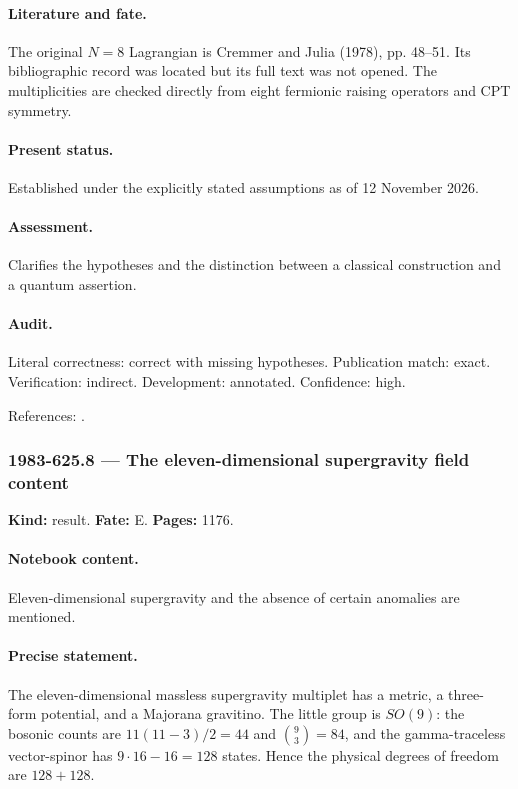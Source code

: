 \paragraph{Literature and fate.} The original \(N=8\) Lagrangian is Cremmer and Julia (1978), pp. 48–51. Its bibliographic record was located but its full text was not opened. The multiplicities are checked directly from eight fermionic raising operators and CPT symmetry.

\paragraph{Present status.} Established under the explicitly stated assumptions as of 12 November 2026.

\paragraph{Assessment.} Clarifies the hypotheses and the distinction between a classical construction and a quantum assertion.

\paragraph{Audit.} Literal correctness: correct with missing hypotheses. Publication match: exact. Verification: indirect. Development: annotated. Confidence: high.

\noindent References: \citep{cremmerjulia1978eight}.\par

\subsubsection{1983-625.8 --- The eleven-dimensional supergravity field content}

\label{item:1983-625.8}

\noindent\textbf{Kind:} result. \textbf{Fate:} E. \textbf{Pages:} 1176.\par

\paragraph{Notebook content.} Eleven-dimensional supergravity and the absence of certain anomalies are mentioned.

\paragraph{Precise statement.} The eleven-dimensional massless supergravity multiplet has a metric, a three-form potential, and a Majorana gravitino. The little group is \(SO(9)\): the bosonic counts are \(11(11-3)/2=44\) and \(\binom93=84\), and the gamma-traceless vector-spinor has \(9\cdot16-16=128\) states. Hence the physical degrees of freedom are \(128+128\).


